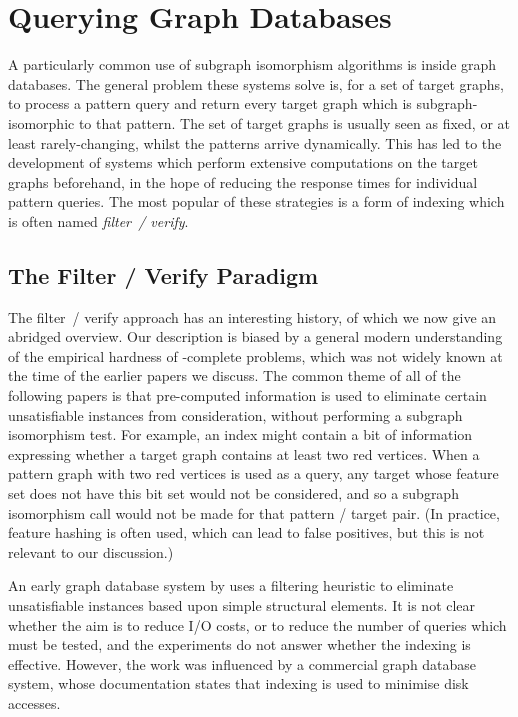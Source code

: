 \documentclass[twoside,11pt]{article}
\begin{document}
\section{Querying Graph Databases}\label{section:filterverify}

A particularly common use of subgraph isomorphism algorithms is inside graph databases.  The
general problem these systems solve is, for a set of target graphs, to process a pattern query and
return every target graph which is subgraph-isomorphic to that pattern. The set of target graphs is
usually seen as fixed, or at least rarely-changing, whilst the patterns arrive dynamically. This has
led to the development of systems which perform extensive computations on the target graphs
beforehand, in the hope of reducing the response times for individual pattern queries. The most
popular of these strategies is a form of indexing which is often named \emph{filter~/ verify}.

\subsection{The Filter / Verify Paradigm}

The filter~/ verify approach has an interesting history, of which we now give an abridged
overview. Our description is biased by a general modern understanding of the empirical
hardness of \NP-complete problems, which was not widely known at the time of the earlier
papers we discuss. The common theme of all of the following papers is that pre-computed information
is used to eliminate certain unsatisfiable instances from consideration, without performing a
subgraph isomorphism test. For example, an index might contain a bit of information expressing
whether a target graph contains at least two red vertices. When a pattern graph with two red
vertices is used as a query, any target whose feature set does not have this bit set would not be
considered, and so a subgraph isomorphism call would not be made for that pattern / target pair. (In
practice, feature hashing is often used, which can lead to false positives, but this is not relevant
to our discussion.)

An early graph database system by  uses a filtering heuristic to
eliminate unsatisfiable instances based upon simple structural elements. It is not clear whether the
aim is to reduce I/O costs, or to reduce the number of queries which must be tested, and the
experiments do not answer whether the indexing is effective. However, the work was influenced by a commercial
graph database system, whose documentation \cite{o:Daylight} states that indexing is
used to minimise disk accesses.
\end{document}
